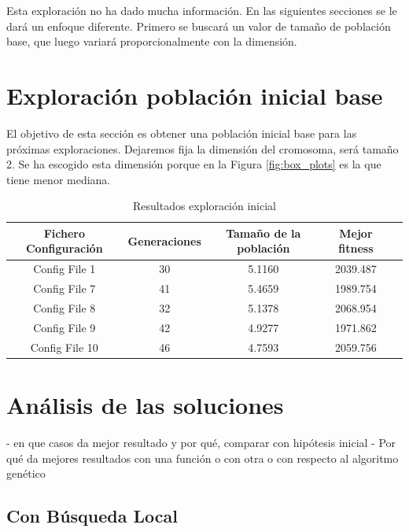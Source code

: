 Esta exploración no ha dado mucha información. En las siguientes secciones se le dará un enfoque diferente. Primero se buscará un valor de
tamaño de población base, que luego variará proporcionalmente con la dimensión.


\section{Exploración población inicial base}

El objetivo de esta sección es obtener una población inicial base para las próximas exploraciones. Dejaremos fija la dimensión del cromosoma,
será tamaño 2. Se ha escogido esta dimensión porque en la Figura \ref{fig:box_plots} es la que tiene menor mediana.




\begin{table}[]
    \centering
    \begin{tabular}{||c|c|c|c|c||}
        \hline
        \textbf{Fichero Configuración} & \textbf{Generaciones} & \textbf{Tamaño de la población} & \textbf{Mejor fitness} \\ \hline
        Config File 1   & 30    & 5.1160  & 2039.487   \\ \hline
        Config File 7   & 41    & 5.4659  & 1989.754   \\ \hline
        Config File 8   & 32    & 5.1378  & 2068.954   \\ \hline
        Config File 9   & 42    & 4.9277  & 1971.862   \\ \hline
        Config File 10   & 46    & 4.7593  & 2059.756   \\ \hline
    \end{tabular}
    \caption{Resultados exploración inicial}
    \label{tab:base_population}
\end{table}



\section{Análisis de las soluciones}

- en que casos da mejor resultado y por qué, comparar con hipótesis inicial
- Por qué da mejores resultados con una función o con otra o con respecto al algoritmo genético

\subsection{Con Búsqueda Local}

